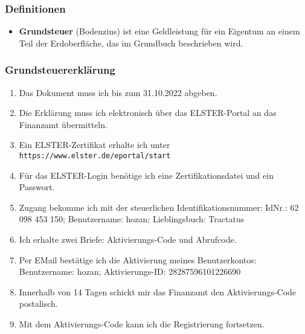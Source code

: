\documentclass[10pt,a4paper]{article}
\newcommand\emps[1] {{\color {indigo(web)} {\bf #1}}}     %
\begin{document}
\subsubsection{Definitionen}

\begin{mdframed}[style=daystyle, leftmargin=-25pt]
  \begin{itemize}
    \setlength\itemsep{-3pt}
  \item {\emps {Grundsteuer}} (Bodenzins) ist eine Geldleistung für ein
    Eigentum an einem Teil der Erdoberfläche, das im Grundbuch beschrieben wird.
  \end{itemize}
\end{mdframed}

\subsubsection{Grundsteuererklärung}

\begin{enumerate}[label={\Square}]
    \setlength\itemsep{-3pt}
  
  \item Das Dokument muss ich bis zum 31.10.2022 abgeben.
  \item Die Erklärung muss ich elektronisch über das ELSTER-Portal an das
    Finanzamt übermitteln.
  \item Ein ELSTER-Zertifikat erhalte ich unter \verb+https://www.elster.de/eportal/start+
  \item Für das ELSTER-Login benötige ich eine Zertifikationsdatei und ein Passwort.
  \item [\XBox] Zugang bekomme ich mit der steuerlichen Identifikationsnummer:
    IdNr.: 62 098 453 150; Benutzername: hozan; Lieblingsbuch: Tractatus
  \item Ich erhalte zwei Briefe: Aktivierungs-Code und Abrufcode.
  \item  [\XBox] Per EMail bestätige ich die Aktivierung meines Benutzerkontos:
    Benutzername: hozan; Aktivierungs-ID: 28287596101226690
  \item Innerhalb von 14 Tagen schickt mir das Finanzamt den Aktivierungs-Code
    postalisch.
  \item Mit dem Aktivierungs-Code kann ich die Registrierung fortsetzen.
    
\end{enumerate}

\end{document}
